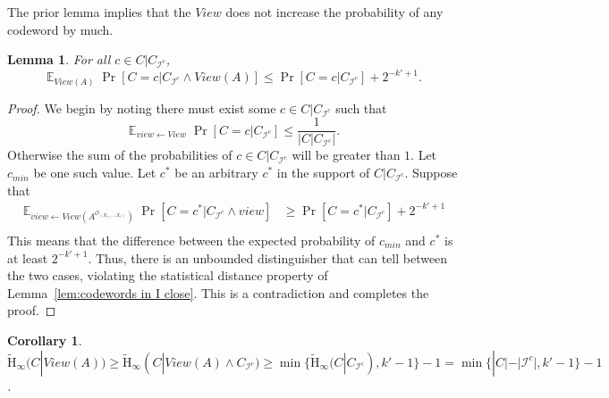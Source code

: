\documentclass[11pt]{article}
\newcommand{\lemref}[1]{\mbox{Lemma~\ref{#1}}}
\DeclareMathOperator*{\expe}{\mathbb{E}}
\newcommand{\ngl}{\ensuremath{\mathtt{ngl}}\xspace}
\newcommand{\Hav}{\tilde{\mathrm{H}}_\infty}
\newtheorem{lemma}[theorem]{Lemma}
\newtheorem{corollary}[theorem]{Corollary}
\newcommand{\authnote}[2]{{\textcolor{red}{\textsf{#1 notes: }\textcolor{blue}{ #2}}\marginpar{\textcolor{red}{\textbf{!!!!!}}}}}
\newcommand{\authnote}[2]{}
\newcommand{\bnote}[1]{{\authnote{Ben}{#1}}}
\begin{document}
The prior lemma implies that the $View$ does not increase the probability of any codeword by much.
\begin{lemma}
\label{lem:no codeword high prob}
For all $c\in C|C_{\mathcal{I}^c}$, 
\[
\expe_{View(A)} \Pr[C=c | C_{\mathcal{I}^c} \wedge View(A)] \leq \Pr[C=c | C_{\mathcal{I}^c}]+2^{-k'+1}.
\]
\end{lemma}
\begin{proof}
We begin by noting there must exist some $c\in C|C_{\mathcal{I}^c}$ such that 
\[
\expe_{view\leftarrow View}\Pr[C = c | C_{\mathcal{I}^c}] \le \frac{1}{| C| C_{\mathcal{I}^c}|}.
\]
Otherwise the sum of the probabilities of $c\in C | C_{\mathcal{I}^c}$ will be greater than $1$.  Let $c_{min}$ be one such value.
Let $c^*$ be an arbitrary $c^*$ in the support of $C|C_{\mathcal{I}^c}$.  Suppose that  
\begin{align*}
\expe_{view \leftarrow View(A^{\mathcal{O}_{(X_1,..., X_\ell)}})}\Pr[C=c^* | C_{\mathcal{I}^c} \wedge view ] &\geq \Pr[C=c^* | C_{\mathcal{I}^c} ]+ 2^{-k'+1} \\
\end{align*}
This means that the difference between the expected probability of $c_{min}$ and $c^*$ is at least $2^{-k'+1}$.  Thus, there is an unbounded distinguisher that can tell between the two cases, violating the statistical distance property of   \lemref{lem:codewords in I close}.  This is a contradiction and completes the proof.
\end{proof}
\begin{corollary}
\label{cor:avg min after view}
$\Hav(C| View(A))\geq \Hav(C | View (A) \wedge C_{\mathcal{I}^c}) \geq \min \{ \Hav(C | C_{\mathcal{I}^c}), k'-1\} -1= \min\{ |C| - |\mathcal{I}^c|, k'-1\} -1$.
\end{corollary}
\end{document}
